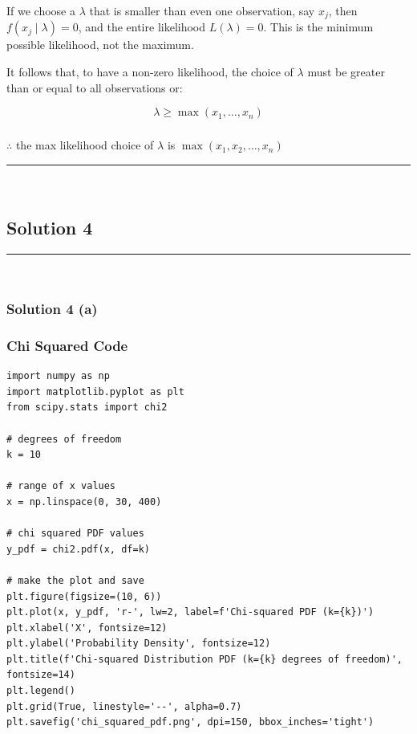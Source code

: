 \documentclass{article}
\begin{document}
\begin{flushleft}
    If we choose a $\lambda$ that is smaller than even one observation, say $x_j$, then $f(x_j \mid \lambda) = 0$, and the entire likelihood $L(\lambda) = 0$. This is the minimum possible likelihood, not the maximum.
\end{flushleft}

\begin{flushleft}
    It follows that, to have a non-zero likelihood, the choice of $\lambda$ must be greater than or equal to all observations or:
\end{flushleft}

$$
\lambda \geq \max(x_1, \ldots, x_n)
$$

\subsubsection*{\normalfont}{$\therefore$ the max likelihood choice of ${\lambda}$ is $\max(x_1, x_2, \ldots, x_n)$}

\noindent\rule{\textwidth}{0.4pt}\\

\newpage

\subsection*{Solution 4}
\noindent\rule{\textwidth}{0.4pt}\\
\subsubsection*{Solution 4 (a)}
\subsubsection*{Chi Squared Code}
\begin{lstlisting}
import numpy as np
import matplotlib.pyplot as plt
from scipy.stats import chi2

# degrees of freedom
k = 10

# range of x values
x = np.linspace(0, 30, 400)

# chi squared PDF values
y_pdf = chi2.pdf(x, df=k)

# make the plot and save
plt.figure(figsize=(10, 6))
plt.plot(x, y_pdf, 'r-', lw=2, label=f'Chi-squared PDF (k={k})')
plt.xlabel('X', fontsize=12)
plt.ylabel('Probability Density', fontsize=12)
plt.title(f'Chi-squared Distribution PDF (k={k} degrees of freedom)', fontsize=14)
plt.legend()
plt.grid(True, linestyle='--', alpha=0.7)
plt.savefig('chi_squared_pdf.png', dpi=150, bbox_inches='tight')
\end{lstlisting}
\end{document}
